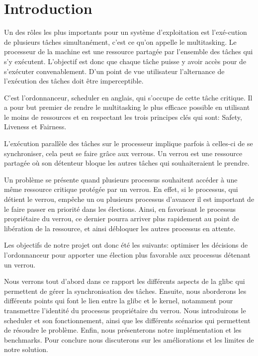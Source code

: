 \section{Introduction}

Un des rôles les plus importants pour un système d'exploitation est
l'exé-cution de plusieurs tâches simultanément, c'est ce qu'on
appelle le multitasking. Le processeur de la machine est une ressource
partagée par l'ensemble des tâches qui s'y exécutent. L'objectif est donc
que chaque tâche puisse y avoir accès pour de s'exécuter 
convenablement. D'un point de vue utilisateur l'alternance de l'exécution
des tâches doit être imperceptible.

C'est l'ordonnanceur, scheduler en anglais, qui s'occupe de cette tâche
critique. Il a pour but premier de rendre le multitasking le plus efficace
possible en utilisant le moins de ressources et en respectant les trois principes
clés qui sont: Safety, Liveness et Fairness.

L'exécution parallèle des tâches sur le processeur implique parfois à celles-ci
de se synchroniser, cela peut se faire grâce aux verrous. Un verrou est une
ressource partagée où son détenteur bloque les autres tâches qui
souhaiteraient le prendre. 

Un problème se présente quand plusieurs processus souhaitent accéder à une même
ressource critique protégée par un verrou. 
En effet, si le processus, qui détient le verrou, empêche un ou plusieurs processus 
d'avancer il est important de le faire passer en priorité dans les 
élections. Ainsi, en favorisant le processus propriétaire du verrou, ce dernier 
pourra arriver plus rapidement au point de libération de la ressource, et ainsi 
débloquer les autres processus en attente.

Les objectifs de notre projet ont donc été les suivants: optimiser les
décisions de l'ordonnanceur pour apporter une élection plus favorable aux
processus détenant un verrou.

Nous verrons tout d'abord dans ce rapport les différents aspects de la glibc
qui permettent de gérer la synchronisation des tâches. Ensuite, nous aborderons
les différents points qui font le lien entre la glibc et le kernel, notamment
pour transmettre l'identité du processus propriétaire du verrou. Nous introduirons
le scheduler et son fonctionnement, ainsi que les différents scénarios qui permettent
de résoudre le problème. Enfin, nous présenterons notre implémentation et les
benchmarks. Pour conclure nous discuterons sur les améliorations et les limites de notre solution.
